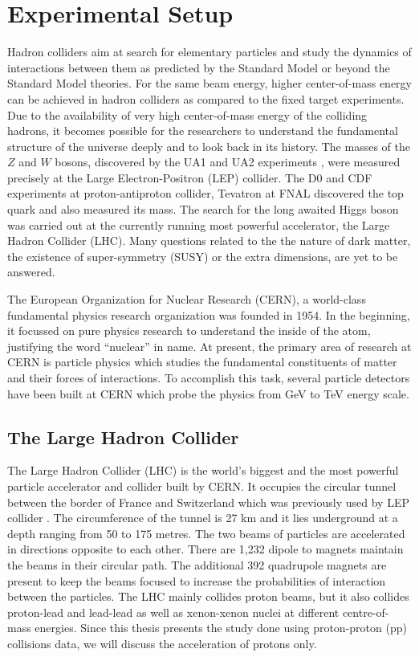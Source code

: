 \chapter{Experimental Setup}
\label{chap:Detector}
Hadron colliders aim at search for elementary particles and study the dynamics of interactions between them as predicted by the Standard Model or beyond the Standard Model theories. For the same beam energy, higher center-of-mass energy can be achieved in hadron colliders as compared to the fixed target experiments. Due to the availability of very high center-of-mass energy of the colliding hadrons, it becomes possible for the researchers to understand the fundamental structure of the universe deeply and to look back in its history. The masses of the $Z$ and $W$ bosons, discovered by the UA1 and UA2 experiments \cite{Arnison:1983rp,Banner:1983jy}, were measured precisely at the Large Electron-Positron (LEP) collider. The D0 \cite{Abachi:1994je} and CDF \cite{Abe:1994st} experiments at proton-antiproton collider, Tevatron at FNAL discovered the top quark and also measured its mass. The search for the long awaited Higgs boson was carried out at the currently running most powerful accelerator, the Large Hadron Collider (LHC). Many questions related to the the nature of dark matter, the existence of super-symmetry (SUSY) or the extra dimensions, are yet to be answered. 

The European Organization for Nuclear Research (CERN), a world-class fundamental physics research organization was founded in 1954. In the beginning, it focussed on pure physics research to understand the inside of the atom, justifying the word ``nuclear'' in name. At present, the primary area of research at CERN is particle physics which studies the fundamental constituents of matter and their forces of interactions. To accomplish this task, several particle detectors have been built at CERN which probe the physics from GeV to TeV energy scale.

\section{The Large Hadron Collider}
The Large Hadron Collider (LHC) \cite{Evans:2008zzb} is the world's biggest and the most powerful particle accelerator and collider built by CERN. It occupies the circular tunnel between the border of France and Switzerland which was previously used by LEP collider \cite{LEP}. The circumference of the tunnel is 27 km and it lies underground at a depth ranging from 50 to 175 metres. The two beams of particles are accelerated in directions opposite to each other. There are 1,232 dipole to magnets maintain the beams in their circular path. The additional 392 quadrupole magnets are present to keep the beams focused to increase the probabilities of interaction between the particles. The LHC mainly collides proton beams, but it also collides proton-lead and lead-lead as well as xenon-xenon nuclei at different centre-of-mass energies. Since this thesis presents the study done using proton-proton (pp) collisions data, we will discuss the acceleration of protons only. 

